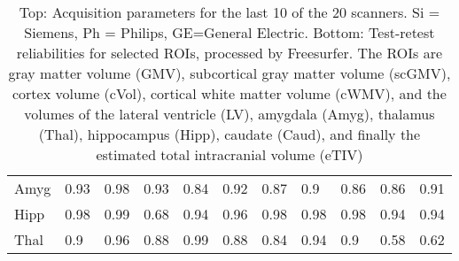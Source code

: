 \begin{table}
\begin{tabular}{lllllllllll}
Amyg                      &   0.93 &   0.98 &   0.93 &   0.84 &   0.92 &   0.87 &    0.9 &   0.86 &   0.86 &   0.91 \\
Hipp                   &   0.98 &   0.99 &   0.68 &   0.94 &   0.96 &   0.98 &   0.98 &   0.98 &   0.94 &   0.94 \\
Thal               &    0.9 &   0.96 &   0.88 &   0.99 &   0.88 &   0.84 &   0.94 &    0.9 &   0.58 &   0.62 \\
\bottomrule
\end{tabular}
\caption{Top: Acquisition parameters for the last 10 of the 20 scanners. Si = Siemens, Ph = Philips, GE=General Electric. Bottom: Test-retest reliabilities for selected ROIs, processed by Freesurfer. The ROIs are gray matter volume (GMV), subcortical gray matter volume (scGMV), cortex volume (cVol), cortical white matter volume (cWMV), and the volumes of the lateral ventricle (LV), amygdala (Amyg), thalamus (Thal), hippocampus (Hipp), caudate (Caud), and finally the estimated total intracranial volume (eTIV)} 
\label{tab:acquisition2}

\end{table}
